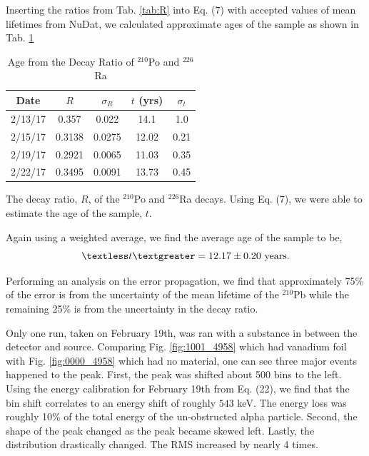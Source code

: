 \documentclass[10pt]{IEEEtran}
\begin{document}
Inserting the ratios from Tab. \ref{tab:R} into Eq. (7) with accepted values of mean lifetimes from NuDat\cite{sonzogni}, we calculated approximate ages of the sample as shown in Tab. \ref{tab:t}

     \begin{table}[!h]
        \begin{center}
        \caption{Age from the Decay Ratio of $^{210}$Po and $^{226}$Ra}
        \label{tab:t}
        \begin{tabular}{|c|c|c|c|c|}
            \hline
            Date & $R$ & $\sigma_R$ & $t$ (yrs) & $\sigma_t$\\
            \hline
            2/13/17 & 0.357 & 0.022 & 14.1 & 1.0\\
            \hline
            2/15/17 & 0.3138 & 0.0275 & 12.02 & 0.21 \\
            \hline
            2/19/17 & 0.2921 & 0.0065 & 11.03 & 0.35\\
            \hline
            2/22/17 & 0.3495 & 0.0091 & 13.73 & 0.45\\
            \hline
        \end{tabular}
        \end{center}
The decay ratio, $R$, of the $^{210}$Po and $^{226}$Ra decays. Using Eq. (7), we were able to estimate the age of the sample, $t$.
    \end{table}
Again using a weighted average, we find the average age of the sample to be,
	\begin{equation}
		\textless t\textgreater = 12.17\pm0.20\text{ years}.
	\end{equation}
	
Performing an analysis on the error propagation, we find that approximately 75\% of the error is from the uncertainty of the mean lifetime of the $^{210}$Pb while the remaining 25\% is from the uncertainty in the decay ratio.

Only one run, taken on February 19th, was ran with a substance in between the detector and source. Comparing Fig. \ref{fig:1001_4958} which had vanadium foil with Fig. \ref{fig:0000_4958} which had no material, one can see three major events happened to the peak. First, the peak was shifted about 500 bins to the left. Using the energy calibration for February 19th from Eq. (22), we find that the bin shift correlates to an energy shift of roughly $543$ keV. The energy loss was roughly 10\% of the total energy of the un-obstructed alpha particle. Second, the shape of the peak changed as the peak became skewed left. Lastly, the distribution drastically changed. The RMS increased by nearly 4 times.
\end{document}
